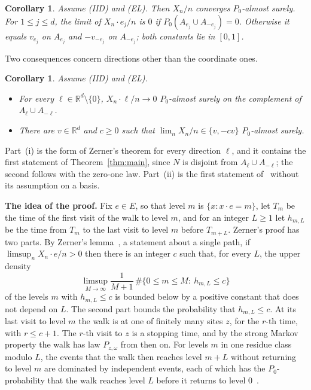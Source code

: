 \documentclass[11pt]{amsart}
\newtheorem{corollary}[theorem]{Corollary}
\theoremstyle{remark}
\newcommand{\R}{\mathbb{R}}
\begin{document}
\begin{corollary}\label{cor:lln}
Assume (IID) and (EL). Then $X_n/n$ converges $P_0$-almost surely. For \mbox{$1\le j\le d$}, the limit of
$X_n\cdot e_j/n$ is $0$ if $P_0(A_{e_j}\cup A_{-e_j})=0$. Otherwise it equals $v_{e_j}$ on $A_{e_j}$ and $-v_{-e_j}$ on
$A_{-e_j}$; both constants lie in $[0,1]$.
\end{corollary}

Two consequences concern directions other than the coordinate ones.

\begin{corollary}\label{cor:direction}
Assume (IID) and (EL).
\begin{itemize}
\item[(i)] For every $\ell\in\R^d\setminus\{0\}$, $X_n\cdot\ell/n\to0$ $P_0$-almost surely on the complement of
$A_\ell\cup A_{-\ell}$.
\item[(ii)] There are $v\in\R^d$ and $c\ge0$ such that $\lim_nX_n/n\in\{v,-cv\}$ $P_0$-almost surely.
\end{itemize}
\end{corollary}

Part~(i) is the form of Zerner's theorem for every direction $\ell$, and it contains the first statement of
Theorem~\ref{thm:main}, since $N$ is disjoint from $A_\ell\cup A_{-\ell}$; the second follows with the zero-one law. Part~(ii) is the first statement of~\cite[Theorem 4.8]{KZ13} without its
assumption on a basis.

\medskip\noindent\textbf{The idea of the proof.} Fix $e\in E$, so that level $m$ is $\{x:x\cdot e=m\}$, let $T_m$ be the
time of the first visit of the walk to level $m$, and for an integer $L\ge1$ let $h_{m,L}$ be the time from $T_m$ to the last visit
to level $m$ before $T_{m+L}$. Zerner's proof has two parts. By Zerner's lemma~\cite[Lemma 3]{Zer02}, a statement about a single path,
if $\limsup_nX_n\cdot e/n>0$ then there is an integer $c$ such that, for every $L$, the upper density
\[
\limsup_{M\to\infty}\frac1{M+1}\,\#\{0\le m\le M:\ h_{m,L}\le c\}
\]
of the levels $m$ with $h_{m,L}\le c$ is bounded below by a positive constant that does not depend on $L$. The second
part bounds the probability that $h_{m,L}\le c$. At its last visit to level $m$ the walk is at one of finitely many
sites $z$, for the $r$-th time, with $r\le c+1$. The $r$-th visit to $z$ is a stopping time, and by the strong Markov
property the walk has law $P_{z,\omega}$ from then on. For levels $m$ in one residue class modulo $L$, the events that the walk then reaches
level $m+L$ without returning to level $m$ are dominated by independent events, each of which has the $P_0$-probability that the walk
reaches level $L$ before it returns to level $0$~\cite[(15)]{Zer02}.
\end{document}
